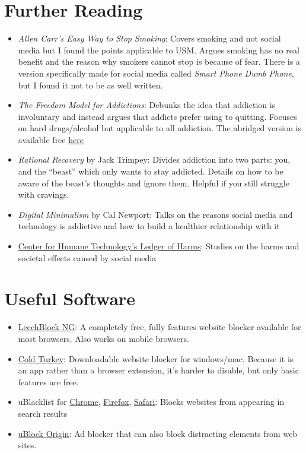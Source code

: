 \documentclass[
  openany]{book}
\providecommand{\tightlist}{%
  \setlength{\itemsep}{0pt}\setlength{\parskip}{0pt}}
\begin{document}
\appendix


\chapter{Further Reading}\label{further-reading}

\begin{itemize}
\tightlist
\item
  \emph{Allen Carr's Easy Way to Stop Smoking}: Covers smoking and not social media but I found the points applicable to USM. Argues smoking has no real benefit and the reason why smokers cannot stop is because of fear. There is a version specifically made for social media called \emph{Smart Phone Dumb Phone}, but I found it not to be as well written.
\item
  \emph{The Freedom Model for Addictions}: Debunks the idea that addiction is involuntary and instead argues that addicts prefer using to quitting. Focuses on hard drugs/alcohol but applicable to all addiction. The abridged version is available free \href{https://archive.org/details/freedom-model-abridged/Freedom\%20Model\%20Abridged/}{here}
\item
  \emph{Rational Recovery} by Jack Trimpey: Divides addiction into two parts: you, and the ``beast'' which only wants to stay addicted. Details on how to be aware of the beast's thoughts and ignore them. Helpful if you still struggle with cravings.
\item
  \emph{Digital Minimalism} by Cal Newport: Talks on the reasons social media and technology is addictive and how to build a healthier relationship with it
\item
  \href{https://ledger.humanetech.com/}{Center for Humane Technology's Ledger of Harms}: Studies on the harms and societal effects caused by social media
\end{itemize}

\chapter{Useful Software}\label{AP-soft}

\begin{itemize}
\tightlist
\item
  \href{https://www.proginosko.com/leechblock/}{LeechBlock NG}: A completely free, fully features website blocker available for most browsers. Also works on mobile browsers.
\item
  \href{https://getcoldturkey.com/}{Cold Turkey}: Downloadable website blocker for windows/mac. Because it is an app rather than a browser extension, it's harder to disable, but only basic features are free.
\item
  uBlacklist for \href{https://chromewebstore.google.com/detail/ublacklist/pncfbmialoiaghdehhbnbhkkgmjanfhe}{Chrome}, \href{https://addons.mozilla.org/en-US/firefox/addon/ublacklist/}{Firefox}, \href{https://apps.apple.com/us/app/ublacklist-for-safari/id1547912640}{Safari}: Blocks websites from appearing in search results
\item
  \href{https://ublockorigin.com/}{uBlock Origin}: Ad blocker that can also block distracting elements from web sites.
\end{itemize}
\end{document}
